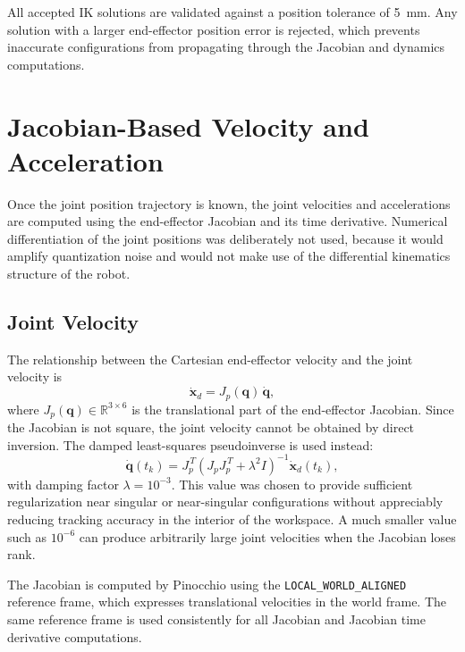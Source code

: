 \documentclass[12pt,a4paper]{article}
\begin{document}
All accepted IK solutions are validated against a position tolerance of \SI{5}{mm}. Any
solution with a larger end-effector position error is rejected, which prevents inaccurate
configurations from propagating through the Jacobian and dynamics computations.

\section{Jacobian-Based Velocity and Acceleration}

Once the joint position trajectory is known, the joint velocities and accelerations are
computed using the end-effector Jacobian and its time derivative. Numerical differentiation
of the joint positions was deliberately not used, because it would amplify quantization noise
and would not make use of the differential kinematics structure of the robot.

\subsection{Joint Velocity}

The relationship between the Cartesian end-effector velocity and the joint velocity is
\begin{equation}
    \dot{\bm{x}}_d = J_p(\bm{q})\,\dot{\bm{q}},
    \label{eq:vel_fwd}
\end{equation}
where $J_p(\bm{q}) \in \mathbb{R}^{3 \times 6}$ is the translational part of the end-effector
Jacobian. Since the Jacobian is not square, the joint velocity cannot be obtained by direct
inversion. The damped least-squares pseudoinverse is used instead:
\begin{equation}
    \dot{\bm{q}}(t_k)
    = J_p^{\,T}\!\left(J_p J_p^{\,T} + \lambda^2 I\right)^{-1}\dot{\bm{x}}_d(t_k),
    \label{eq:qdot}
\end{equation}
with damping factor $\lambda = 10^{-3}$. This value was chosen to provide sufficient
regularization near singular or near-singular configurations without appreciably reducing
tracking accuracy in the interior of the workspace. A much smaller value such as $10^{-6}$
can produce arbitrarily large joint velocities when the Jacobian loses rank.

The Jacobian is computed by Pinocchio using the \texttt{LOCAL\_WORLD\_ALIGNED} reference frame,
which expresses translational velocities in the world frame. The same reference frame is used
consistently for all Jacobian and Jacobian time derivative computations.
\end{document}
